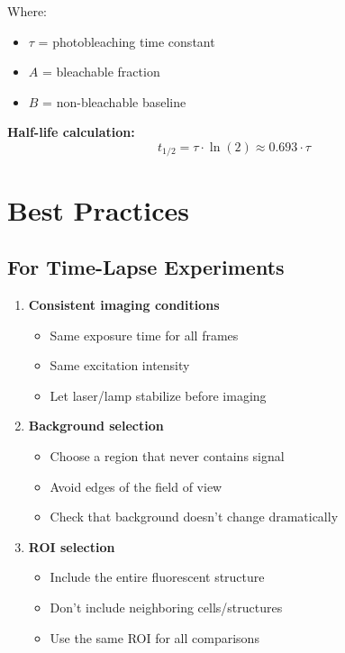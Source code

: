\documentclass[11pt,a4paper]{article}
\begin{document}
Where:
\begin{itemize}
    \item $\tau$ = photobleaching time constant
    \item $A$ = bleachable fraction
    \item $B$ = non-bleachable baseline
\end{itemize}

\textbf{Half-life calculation:}
\begin{equation}
t_{1/2} = \tau \cdot \ln(2) \approx 0.693 \cdot \tau
\end{equation}

\section{Best Practices}

\subsection{For Time-Lapse Experiments}

\begin{enumerate}
    \item \textbf{Consistent imaging conditions}
    \begin{itemize}
        \item Same exposure time for all frames
        \item Same excitation intensity
        \item Let laser/lamp stabilize before imaging
    \end{itemize}
    
    \item \textbf{Background selection}
    \begin{itemize}
        \item Choose a region that never contains signal
        \item Avoid edges of the field of view
        \item Check that background doesn't change dramatically
    \end{itemize}
    
    \item \textbf{ROI selection}
    \begin{itemize}
        \item Include the entire fluorescent structure
        \item Don't include neighboring cells/structures
        \item Use the same ROI for all comparisons
    \end{itemize}
\end{enumerate}
\end{document}
